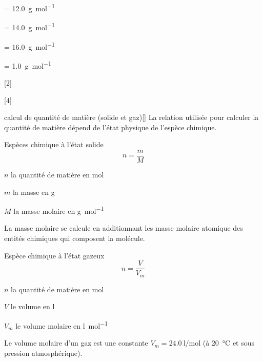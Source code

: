 \begin{donnees}[2]
  \item {} = \qty{12,0}{\g\per\mole}
  \item {} = \qty{14,0}{\g\per\mole}
  \item {} = \qty{16,0}{\g\per\mole}
  \item {} = \qty{1,0}{\g\per\mole}
\end{donnees}

[2]

[4]


\begin{doc}{calcul de quantité de matière (solide et gaz)}[\label{doc:calcul_mole_sol_gaz}]
  La relation utilisée pour calculer la quantité de matière dépend de l'état physique de l'espèce chimique.
  \begin{multicols}{2}
    Espèces chimique à l'état solide
    \begin{equation*}
      n = \dfrac{m}{M}
    \end{equation*}
    \begin{listePoints}
      \item $n$ la quantité de matière en \unit{\mole}
      \item $m$ la masse en \unit{\g}
      \item $M$ la masse molaire en \unit{\g\per\mole}
    \end{listePoints}
    La masse molaire se calcule en additionnant les masse molaire atomique des entités chimiques qui composent la molécule.
    
    Espèce chimique à l'état gazeux
    \begin{equation*}
      n = \dfrac{V}{V_m}
    \end{equation*}
    \begin{listePoints}
      \item $n$ la quantité de matière en \unit{\mole}
      \item $V$ le volume en \unit{\litre}
      \item $V_m$ le volume molaire en \unit{\litre\per\mole}
    \end{listePoints}
    Le volume molaire d'un gaz est une constante $V_m = \qty{24,0}{\litre\per\mole}$ (à \qty{20}{\degreeCelsius} et sous pression atmosphérique).
  \end{multicols}
\end{doc}

